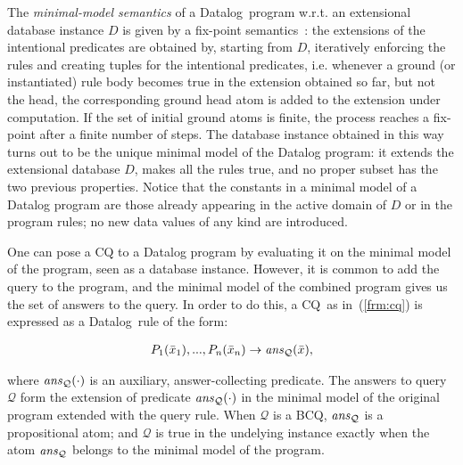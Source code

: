 \documentclass[format=acmsmall, review=false, screen=true]{acmart}
\newcommand{\ignore}[1]{}
\newcommand{\bcq}{BCQ}
\newcommand{\cq}{CQ}
\newcommand{\mc}[1]{\mathcal{ #1}}
\newcommand{\nit}[1]{{\it #1}}
\newcommand{\da}{Datalog}
\newcommand{\vectt}[1]{\bar{#1}}
\newcommand{\red}[1]{{#1}}
\begin{document}
The {\em minimal-model semantics} of a \da \ program w.r.t. an extensional database instance $D$ is given by a fix-point semantics\red{~\cite{abiteboul}}: the extensions of the intentional predicates are obtained by, starting from $D$, iteratively enforcing the rules and creating tuples for the intentional predicates, i.e. whenever a ground (or instantiated) rule body becomes true in the extension obtained so far, but not the head, the corresponding ground head atom is added to the extension under computation. If the set of initial ground atoms is finite, the process reaches a fix-point after a finite number of steps. \red{The database instance obtained in this way turns out to be the unique minimal model of the Datalog program: it extends the extensional database $D$, makes all the rules true, and no proper subset  has the two previous properties. Notice that the constants in a minimal model of a Datalog program are those already appearing in the active domain of $D$ or in the program rules; no new data values of any kind are introduced.}

\red{One can pose a CQ to a Datalog program by evaluating it on the minimal model of the program, seen as a database instance. However, it is common to add the query to the program, and the  minimal model of the combined program gives us the set of answers to the query. In order to do this,} a  \cq \ as in~(\ref{frm:cq}) is expressed as a \da \ rule of the form\ignore{ \red{(this is an alternative for defining \cq s over a program)}}:

\vspace{-4mm}
\begin{align}P_1(\vectt{x}_1),...,P_n(\vectt{x}_n)\rightarrow \nit{ans}_\mc{Q}(\vectt{x}),\end{align}
\vspace{-4mm}

\noindent where $\nit{ans}_\mc{Q}(\cdot)$ \ignore{ \notin \mc{R}$} is an auxiliary, answer-collecting predicate.  The answers to query $\mc{Q}$ form the extension of  predicate $\nit{ans}_\mc{Q}(\cdot)$ in the minimal model \red{of the original program extended with the query rule.} When $\mc{Q}$  is a \bcq,  $\nit{ans}_{\mc{Q}}$ is a propositional atom; and $\mc{Q}$ is true in the undelying instance exactly when the atom $\nit{ans}_\mc{Q}$ belongs to the minimal model of the program.
\end{document}
